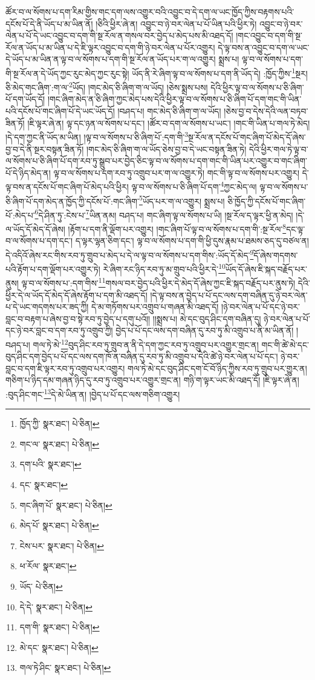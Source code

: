 ཚོར་བ་ལ་སོགས་པ་དག་རིམ་གྱིས་གང་དག་ལས་འགྱུར་བའི་འབྱུང་བ་དེ་དག་ལ་ཡང་ཁྱོད་ཀྱིས་བརྟགས་པའི་དངོས་པོ་དེ་ནི་ཡོད་པ་མ་ཡིན་ནོ། །ཅིའི་ཕྱིར་ཞེ་ན། འབྱུང་བ་ཉེ་བར་ལེན་པ་པོ་ཡིན་པའི་ཕྱིར་ཏེ། འབྱུང་བ་ཉེ་བར་ལེན་པ་པོ་དེ་ཡང་འབྱུང་བ་དག་གི་སྔ་རོལ་ན་གསལ་བར་བྱེད་པ་མེད་པས་མི་འཐད་དོ། །གང་འབྱུང་བ་དག་གི་སྔ་རོལ་ན་ཡོད་པ་མ་ཡིན་པ་དེ་ཇི་ལྟར་འབྱུང་བ་དག་གི་ཉེ་བར་ལེན་པ་པོར་འགྱུར། དེ་ལྟ་བས་ན་འབྱུང་བ་དག་ལ་ཡང་དེ་ཡོད་པ་མ་ཡིན་ན་ལྟ་བ་ལ་སོགས་པ་དག་གི་སྔ་རོལ་ན་ཡོད་པར་ག་ལ་འགྱུར། སྨྲས་པ། ལྟ་བ་ལ་སོགས་པ་དག་གི་སྔ་རོལ་ན་དེ་ཡོད་ཀྱང་རུང་མེད་ཀྱང་རུང་སྟེ། ཡོད་ནི་རེ་ཞིག་ལྟ་བ་ལ་སོགས་པ་དག་ནི་ཡོད་དེ། :ཁྱོད་ཀྱིས་\footnote{ཁྱོད་ཀྱི་  སྣར་ཐང་།  པེ་ཅིན། }སྔར། ཅི་མེད་གང་ཞིག་:ག་ལ་\footnote{གང་ལ་  སྣར་ཐང་།  པེ་ཅིན། }ཡོད། །གང་མེད་ཅི་ཞིག་ག་ལ་ཡོད། །ཅེས་སྨྲས་པས། དེའི་ཕྱིར་ལྟ་བ་ལ་སོགས་པ་ཅི་ཞིག་པོ་དག་ཡོད་དོ། །གང་ཞིག་མེད་ན་ཅི་ཞིག་ཀྱང་མེད་པས་དེའི་ཕྱིར་ལྟ་བ་ལ་སོགས་པ་ཅི་ཞིག་པོ་དག་གང་གི་ཡིན་པའི་དངོས་པོ་གང་ཞིག་པོ་དེ་ཡང་ཡོད་དོ། །བཤད་པ། གང་མེད་ཅི་ཞིག་ག་ལ་ཡོད། །ཅེས་བྱ་བ་དེས་དེའི་ལན་བཏབ་ཟིན་ཏོ། །ཇི་ལྟར་ཞེ་ན། ལྟ་དང་ཉན་ལ་སོགས་པ་དང་། །ཚོར་བ་དག་ལ་སོགས་པ་ཡང་། །གང་གི་ཡིན་པ་གལ་ཏེ་མེད། །དེ་དག་ཀྱང་ནི་ཡོད་མ་ཡིན། །ལྟ་བ་ལ་སོགས་པ་ཅི་ཞིག་པོ་:དག་གི་\footnote{དག་པའི་  སྣར་ཐང་། }སྔ་རོལ་ན་དངོས་པོ་གང་ཞིག་པོ་མེད་དོ་ཞེས་བྱ་བ་དེ་ནི་སྔར་བསྟན་ཟིན་ཏོ། །གང་མེད་ཅི་ཞིག་ག་ལ་ཡོད་ཅེས་བྱ་བ་དེ་ཡང་བསྟན་ཟིན་ཏེ། དེའི་ཕྱིར་གལ་ཏེ་ལྟ་བ་ལ་སོགས་པ་ཅི་ཞིག་པོ་དག་རབ་ཏུ་སྒྲུབ་པར་བྱེད་ཅིང་ལྟ་བ་ལ་སོགས་པ་དག་གང་གི་ཡིན་པར་འགྱུར་བ་གང་ཞིག་པོ་དེ་ཉིད་མེད་ན། ལྟ་བ་ལ་སོགས་པ་དག་རབ་ཏུ་འགྲུབ་པར་ག་ལ་འགྱུར་ཏེ། གང་གི་ལྟ་བ་ལ་སོགས་པར་འགྱུར། དེ་ལྟ་བས་ན་དངོས་པོ་གང་ཞིག་པོ་མེད་པའི་ཕྱིར། ལྟ་བ་ལ་སོགས་པ་ཅི་ཞིག་པོ་དག་\footnote{དང་  སྣར་ཐང་། }ཀྱང་མེད་ལ། ལྟ་བ་ལ་སོགས་པ་ཅི་ཞིག་པོ་དག་མེད་ན་ཁྱོད་ཀྱི་དངོས་པོ་:གང་ཞིག་\footnote{གང་ཞིག་པོ་  སྣར་ཐང་།  པེ་ཅིན། }ཡོད་པར་ག་ལ་འགྱུར། སྨྲས་པ། ཅི་ཁྱོད་ཀྱི་དངོས་པོ་གང་ཞིག་པོ་:མེད་པ་\footnote{མེད་པོ་  སྣར་ཐང་།  པེ་ཅིན། }དེ་ཤིན་ཏུ་:ངེས་པ་\footnote{ངེས་པར་  སྣར་ཐང་།  པེ་ཅིན། }ཡིན་ནམ། བཤད་པ། གང་ཞིག་ལྟ་ལ་སོགས་པ་ཡི། །སྔ་རོལ་ད་ལྟར་ཕྱི་ན་མེད། །དེ་ལ་ཡོད་དོ་མེད་དོ་ཞེས། །རྟོག་པ་དག་ནི་ལྡོག་པར་འགྱུར། །གང་ཞིག་པོ་ལྟ་བ་ལ་སོགས་པ་དག་གི་:སྔ་རོལ་\footnote{ཕ་རོལ་  སྣར་ཐང་། }དང་ལྟ་བ་ལ་སོགས་པ་དག་དང་། ད་ལྟར་ལྷན་ཅིག་དང་། ལྟ་བ་ལ་སོགས་པ་དག་གི་ཕྱི་དུས་རྣམ་པ་ཐམས་ཅད་དུ་བཙལ་ན། དེ་འདིའོ་ཞེས་རང་གིས་རབ་ཏུ་གྲུབ་པ་མེད་པ་དེ་ལ་ལྟ་བ་ལ་སོགས་པ་དག་གིས་:ཡོད་དོ་མེད་\footnote{ཡོད་  པེ་ཅིན། }དོ་ཞེས་གདགས་པའི་རྟོག་པ་དག་ལྡོག་པར་འགྱུར་ཏེ། རེ་ཞིག་རང་ཉིད་རབ་ཏུ་མ་གྲུབ་པའི་ཕྱིར་དེ་\footnote{དེ་དེ་  སྣར་ཐང་།  པེ་ཅིན། }ཡོད་དོ་ཞེས་ཇི་སྐད་བརྗོད་པར་ནུས། ལྟ་བ་ལ་སོགས་པ་:དག་གིས་\footnote{དག་གི་  སྣར་ཐང་།  པེ་ཅིན། }གསལ་བར་བྱེད་པའི་ཕྱིར་དེ་མེད་དོ་ཞེས་ཀྱང་ཇི་སྐད་བརྗོད་པར་ནུས་ཏེ། དེའི་ཕྱིར་དེ་ལ་ཡོད་དོ་མེད་དོ་ཞེས་རྟོག་པ་དག་མི་འཐད་དོ། །དེ་ལྟ་བས་ན་བྱེད་པ་པོ་དང་ལས་དག་བཞིན་དུ་ཉེ་བར་ལེན་པ་དེ་ཡང་གདགས་པར་ཟད་ཀྱི། དེ་མ་གཏོགས་པར་འགྲུབ་པ་གཞན་མི་འཐད་དོ། །ཉེ་བར་ལེན་པ་པོ་དང་ཉེ་བར་བླང་བ་བརྟག་པ་ཞེས་བྱ་བ་སྟེ་རབ་ཏུ་བྱེད་པ་དགུ་པའོ།། །།སྨྲས་པ། མེ་དང་བུད་ཤིང་དག་བཞིན་དུ། ཉེ་བར་ལེན་པ་པོ་དང་ཉེ་བར་བླང་བ་དག་རབ་ཏུ་འགྲུབ་ཀྱི། བྱེད་པ་པོ་དང་ལས་དག་བཞིན་དུ་རབ་ཏུ་མི་འགྲུབ་པ་ནི་མ་ཡིན་ནོ། །བཤད་པ། གལ་ཏེ་མེ་\footnote{མེ་དང་  སྣར་ཐང་།  པེ་ཅིན། }བུད་ཤིང་རབ་ཏུ་གྲུབ་ན་ནི་དེ་དག་ཀྱང་རབ་ཏུ་འགྲུབ་པར་འགྱུར་གྲང་ན། གང་གི་ཚེ་མེ་དང་བུད་ཤིང་དག་བྱེད་པ་པོ་དང་ལས་དག་ཁོ་ན་བཞིན་དུ་རབ་ཏུ་མི་འགྲུབ་པ་དེའི་ཚེ་ཉེ་བར་ལེན་པ་པོ་དང་། ཉེ་བར་བླང་བ་དག་ཇི་ལྟར་རབ་ཏུ་འགྲུབ་པར་འགྱུར། གལ་ཏེ་མེ་དང་བུད་ཤིང་དག་ངོ་བོ་ཉིད་ཀྱིས་རབ་ཏུ་གྲུབ་པར་གྱུར་ན། གཅིག་པ་ཉིད་དམ་གཞན་ཉིད་དུ་རབ་ཏུ་འགྲུབ་པར་འགྱུར་གྲང་ན། གཉི་ག་ལྟར་ཡང་མི་འཐད་དོ། །ཇི་ལྟར་ཞེ་ན། :བུད་ཤིང་གང་\footnote{གལ་ཏེ་ཤིང་  སྣར་ཐང་།  པེ་ཅིན། }དེ་མེ་ཡིན་ན། །བྱེད་པ་པོ་དང་ལས་གཅིག་འགྱུར། 